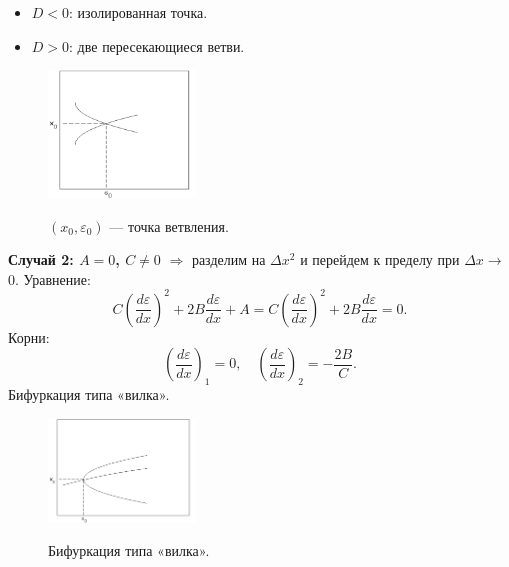 	\begin{itemize}
		\item \( D < 0 \): изолированная точка.
		\vspace{-0.7em}
		\item \( D > 0 \): две пересекающиеся ветви.
	\end{itemize}
	\vspace{-1em}
	\begin{figure}[H]
		\centering
		\includegraphics[width=0.35\textwidth]{img/10_02}
		\par
		{\small \((x_0, \varepsilon_0)\) — точка ветвления.}
		\label{fig:10_02}
	\end{figure}
	\vspace{-1em}
	\textbf{Случай 2: \( A = 0 \), \( C \neq 0 \)} \(\Rightarrow\) разделим на \(\Delta x^2 \) и перейдем к пределу при \(\Delta x \rightarrow\) 0.
	\newline
	Уравнение:
	\begin{equation}
		C \left( \frac{d\varepsilon}{dx} \right)^2 + 2B \frac{d\varepsilon}{dx} + A = C \left( \frac{d\varepsilon}{dx} \right)^2 + 2B \frac{d\varepsilon}{dx} = 0.
	\end{equation}
	Корни:
	\begin{equation}
		\left( \frac{d \varepsilon}{d x} \right)_1 = 0, \quad \left( \frac{d \varepsilon}{d x} \right)_2 = -\frac{2 B}{C}.
	\end{equation}
	Бифуркация типа «вилка».
	\vspace{-1em}
	\begin{figure}[H]
		\centering
		\includegraphics[width=0.35\textwidth]{img/10_03}
		\par
		{\small Бифуркация типа «вилка».}
		\label{fig:10_03}
	\end{figure}
	
